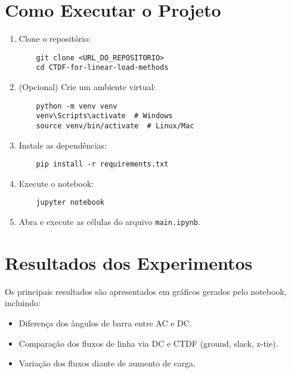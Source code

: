\documentclass[journal]{IEEEtran}
\begin{document}
\section{Como Executar o Projeto}

\begin{enumerate}
    \item Clone o repositório:
    \begin{verbatim}
    git clone <URL_DO_REPOSITORIO>
    cd CTDF-for-linear-load-methods
    \end{verbatim}
    \item (Opcional) Crie um ambiente virtual:
    \begin{verbatim}
    python -m venv venv
    venv\Scripts\activate  # Windows
    source venv/bin/activate  # Linux/Mac
    \end{verbatim}
    \item Instale as dependências:
    \begin{verbatim}
    pip install -r requirements.txt
    \end{verbatim}
    \item Execute o notebook:
    \begin{verbatim}
    jupyter notebook
    \end{verbatim}
    \item Abra e execute as células do arquivo \texttt{main.ipynb}.
\end{enumerate}

\section{Resultados dos Experimentos}

Os principais resultados são apresentados em gráficos gerados pelo notebook, incluindo:

\begin{itemize}
    \item Diferença dos ângulos de barra entre AC e DC.
    \item Comparação dos fluxos de linha via DC e CTDF (ground, slack, z-tie).
    \item Variação dos fluxos diante de aumento de carga.
\end{itemize}

\end{document}
